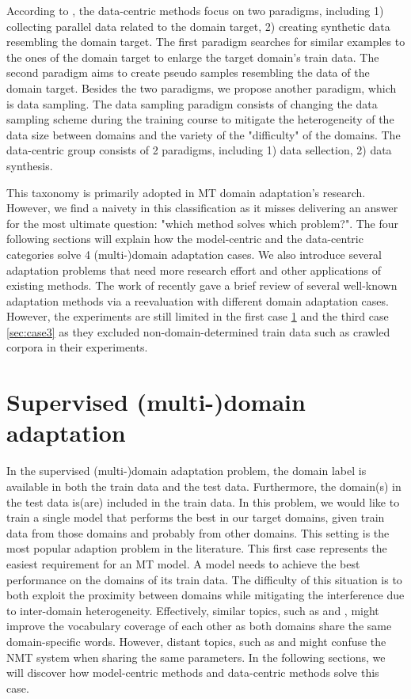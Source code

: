 According to \citet{Chu18asurvey}, the data-centric methods focus on two paradigms, including 1) collecting parallel data related to the domain target, 2) creating synthetic data resembling the domain target. The first paradigm searches for similar examples to the ones of the domain target to enlarge the target domain's train data. The second paradigm aims to create pseudo samples resembling the data of the domain target. Besides the two paradigms, we propose another paradigm, which is data sampling. The data sampling paradigm consists of changing the data sampling scheme during the training course to mitigate the heterogeneity of the data size between domains and the variety of the "difficulty" of the domains. The data-centric group consists of 2 paradigms, including 1) data sellection, 2) data synthesis.

This taxonomy is primarily adopted in MT domain adaptation's research. However, we find a naivety in this classification as it misses delivering an answer for the most ultimate question: "which method solves which problem?". The four following sections will explain how the model-centric and the data-centric categories solve 4 (multi-)domain adaptation cases. We also introduce several adaptation problems that need more research effort and other applications of existing methods. The work of \citet{Pham21revisiting} recently gave a brief review of several well-known adaptation methods via a reevaluation with different domain adaptation cases. However, the experiments are still limited in the first case \ref{sec:case1} and the third case \ref{sec:case3} as they excluded non-domain-determined train data such as crawled corpora in their experiments.

\section{Supervised (multi-)domain adaptation}
\label{sec:case1}
In the supervised (multi-)domain adaptation problem, the domain label is available in both the train data and the test data. Furthermore, the domain(s) in the test data is(are) included in the train data. In this problem, we would like to train a single model that performs the best in our target domains, given train data from those domains and probably from other domains. This setting is the most popular adaption problem in the literature. This first case represents the easiest requirement for an MT model. A model needs to achieve the best performance on the domains of its train data. The difficulty of this situation is to both exploit the proximity between domains while mitigating the interference due to inter-domain heterogeneity. Effectively, similar topics, such as  and , might improve the vocabulary coverage of each other as both domains share the same domain-specific words. However, distant topics, such as  and  might confuse the NMT system when sharing the same parameters. In the following sections, we will discover how model-centric methods and data-centric methods solve this case.
